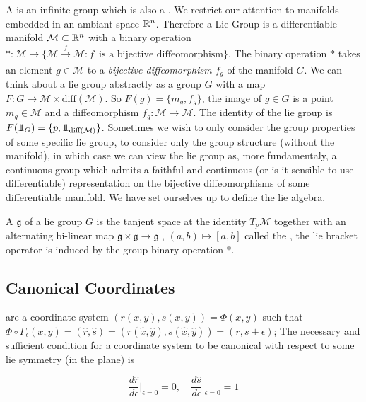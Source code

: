 \documentclass[12pt]{article}
\begin{document}
A  is an infinite group which is also a . We restrict our attention to manifolds embedded in an ambiant space $\mathbb{R}^n$. Therefore a Lie Group is a differentiable manifold $\mathcal M\subset \mathbb{R}^n$ with a binary operation $\ast : \mathcal M \to \{\mathcal M \xrightarrow[]{f} \mathcal M : f\,\text{ is a bijective diffeomorphism}\}$. The binary operation $\ast$ takes an element $g\in \mathcal M$ to a \textit{bijective diffeomorphism} $f_g$ of the manifold $G$. We can think about a lie group abstractly as a group $G$ with a map $F : G\to \mathcal M \times \text{diff} (\mathcal M)$. So $F(g) = \{m_g,f_g\}$, the image of $g\in G$ is a point $m_g\in\mathcal M$ and a diffeomorphism $f_g : \mathcal M \to \mathcal M$. The identity of the lie group is $F(1\!\!1_G) = \{p , 1\!\!1_{\text{diff}(\mathcal M)}\}$. Sometimes we wish to only consider the group properties of some specific lie group, to consider only the group structure (without the manifold), in which case we can view the lie group as, more fundamentaly, a continuous group which admits a faithful and continuous (or is it sensible to use differentiable) representation on the bijective diffeomorphisms of some differentiable manifold. We have set ourselves up to define the lie algebra. 

A  $\mathfrak g$ of a lie group $G$ is the tanjent space at the identity $T_p\mathcal M$ together with an alternating bi-linear map $\mathfrak g\times \mathfrak g \to \mathfrak g$ , $(a,b)\mapsto [a,b]$ called the , the lie bracket operator is induced by the group binary operation $\ast$. 

 
\subsection{Canonical Coordinates}
 are a coordinate system $(r(x,y),s(x,y)) =\Phi (x,y)$ such that $\Phi\circ \Gamma_\epsilon (x,y) = (\hat r, \hat s) = (r(\hat x,\hat y),s(\hat x,\hat y)) = (r,s+\epsilon)$; The necessary and sufficient condition for a coordinate system to be canonical with respect to some lie symmetry (in the plane) is 

\begin{equation}\label{eq:canonical coordinates condition}
    \frac{d\hat r}{d\epsilon}\bigg|_{\epsilon=0}=0,\quad \frac{d\hat s}{d\epsilon}\bigg|_{\epsilon=0}=1
\end{equation}
\end{document}
